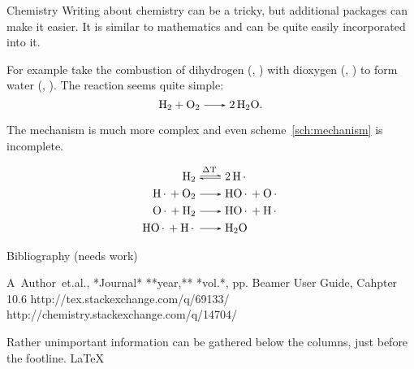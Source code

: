 \documentclass[final]{beamer}
\begin{document}
\begin{frame}[t]
\begin{multicols}{2}
  \begin{block}{Chemistry}
    Writing about chemistry can be a tricky, but additional packages can make it easier.
    It is similar to mathematics and can be quite easily incorporated into it.
  
    For example take the combustion of dihydrogen (, )
    with dioxygen (, ) to form water (, ).\cite{chem.se}
    The reaction seems quite simple: \[\ce{H2 + O2 -> 2 H2O}.\]
  
    The mechanism is much more complex and even scheme~\ref{sch:mechanism} is incomplete.
  
    \begin{align*}
      \ce{H2 &<=>[\Delta T] 2 H.}\\
      \ce{H. + O2 &-> HO. + O.}\\
      \ce{O. + H2 &-> HO. + H.}\\
      \ce{HO. + H. &-> H2O}
    \end{align*}
    \label{sch:mechanism}
  \end{block}

  \begin{block}{Bibliography (needs work)}
    \begin{thebibliography}{99}
       A~Author~et.al., *Journal* **year,** *vol.*,  pp.
       Beamer User Guide, Cahpter 10.6
       http://tex.stackexchange.com/q/69133/
       http://chemistry.stackexchange.com/q/14704/
    \end{thebibliography}
  \end{block}
\end{multicols}

Rather unimportant information can be gathered below the columns,
just before the footline. \dotfill \LaTeX
\end{frame}
\end{document}
